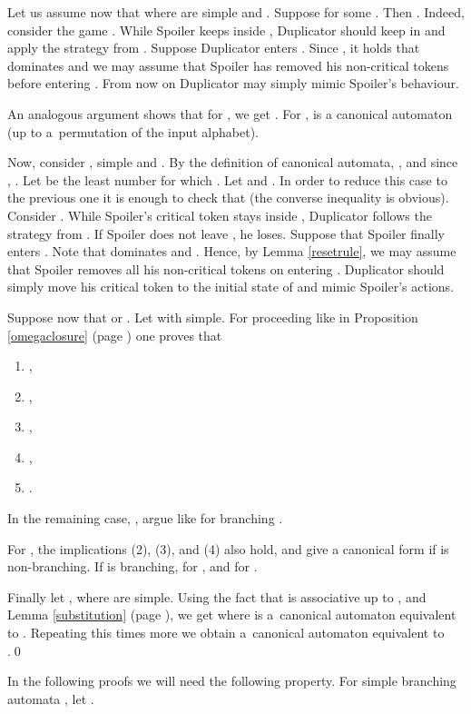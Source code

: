 \documentclass{LMCS}
\begin{document}
Let us assume now that  where  are simple and . Suppose  for some . Then . Indeed, consider the game . While Spoiler keeps inside , Duplicator should keep in  and apply the strategy from . Suppose Duplicator enters . Since , it holds that  dominates  and we may assume that Spoiler has removed his non-critical tokens before entering . From now on Duplicator may simply mimic Spoiler's behaviour. 

An analogous argument shows that for , we get . For ,  is a canonical automaton (up to a~permutation of the input alphabet). 

Now, consider ,  simple and . By the definition of canonical automata, , and since , . Let  be the least number for which . Let  and . In order to reduce this case to the previous one it is enough to check that  (the converse inequality is obvious). Consider . While Spoiler's critical token stays inside , Duplicator follows the strategy from . If Spoiler does not leave , he loses. Suppose that Spoiler finally enters . Note that  dominates  and . Hence, by Lemma \ref{resetrule}, we may assume that Spoiler removes all his non-critical tokens on entering . Duplicator should simply move his critical token to the initial state of  and mimic Spoiler's actions. 

Suppose now that   or . Let  with  simple. For  proceeding like in Proposition \ref{omegaclosure} (page \pageref{omegaclosure}) one proves that 
\begin{enumerate}[(1)]
\item ,
\item , 
\item ,

\item ,
\item .
\end{enumerate}
In the remaining case,  , argue like for branching .

For , the implications (2), (3), and (4) also hold, and give a canonical form if  is non-branching.  If  is branching,  for , and  for .

Finally let , where  are simple. Using the fact that  is associative up to , and Lemma \ref{substitution} (page \pageref{substitution}), we get  where  is a~canonical automaton equivalent to . Repeating this  times more we obtain a~canonical automaton equivalent to .\qed

\vspace{5pt}

In the following proofs we will need the following property. For simple branching automata , let . \index{}
\end{document}
